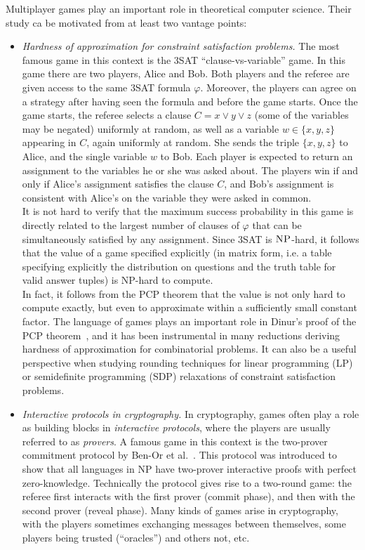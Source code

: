 \documentclass{report}
\theoremstyle{plain}
\theoremstyle{definition}
\theoremstyle{remark}
\newcommand{\NP}{\textsc{NP}}
\numberwithin{equation}{subsection}
\begin{document}
Multiplayer games play an important role in theoretical computer science. Their study ca be motivated from at least two vantage points: 
\begin{itemize}
\item \emph{Hardness of approximation for constraint satisfaction problems.} The most famous game in this context is the $3$SAT ``clause-vs-variable'' game. In this game there are two players, Alice and Bob. Both players and the referee are given access to the same $3$SAT formula $\varphi$. Moreover, the players can agree on a strategy after having seen the formula and before the game starts. Once the game starts, the referee selects a clause $C = x \vee y \vee z$ (some of the variables may be negated) uniformly at random, as well as a variable $w\in\{x,y,z\}$ appearing in $C$, again uniformly at random. She sends the triple $\{x,y,z\}$ to Alice, and the single variable $w$ to Bob. Each player is expected to return an assignment to the variables he or she was asked about. The players win if and only if Alice's assignment satisfies the clause $C$, and Bob's assignment is consistent with Alice's on the variable they were asked in common.\\
It is not hard to verify that the maximum success probability in this game is directly related to the largest number of clauses of $\varphi$ that can be simultaneously satisfied by any assignment. Since $3$SAT is $\NP$-hard, it follows that the value of a game specified explicitly (in matrix form, i.e. a table specifying explicitly the distribution on questions and the truth table for valid answer tuples) is NP-hard to compute. \\
In fact, it follows from the PCP theorem that the value is not only hard to compute exactly, but even to approximate within a sufficiently small constant factor. The language of games plays an important role in 
Dinur's proof of the PCP theorem~\cite{dinur2007pcp}, and it has been instrumental in many reductions deriving hardness of approximation for combinatorial problems. It can also be a useful perspective when studying rounding techniques for linear programming (LP) or semidefinite programming (SDP) relaxations of constraint satisfaction problems. 

\item \emph{Interactive protocols in cryptography.} In cryptography, games often play a role as building blocks in \emph{interactive protocols}, where the players are usually referred to as \emph{provers}. A famous game in this context is the two-prover commitment protocol by Ben-Or et al.~\cite{ben1988multi}. This protocol was introduced to show that all languages in NP have two-prover interactive proofs with perfect zero-knowledge. Technically the protocol gives rise to a two-round game: the referee first interacts with the first prover (commit phase), and then with the second prover (reveal phase). Many kinds of games arise in cryptography, with the players sometimes exchanging messages between themselves, some players being trusted (``oracles'') and others not, etc. 
\end{itemize}
\end{document}
